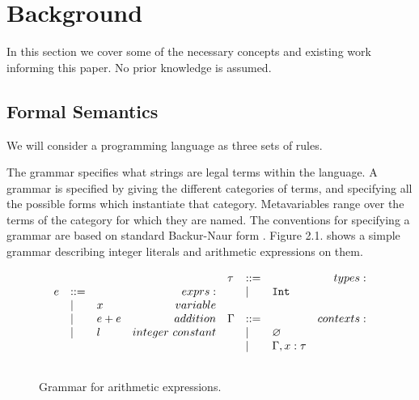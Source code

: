 \chapter{Background}\label{C:background}

In this section we cover some of the necessary concepts and existing work informing this paper. No prior knowledge is assumed.

\section{Formal Semantics}

\noindent
We will consider a programming language as three sets of rules.

The grammar specifies what strings are legal terms within the language. A grammar is specified by giving the different categories of terms, and specifying all the possible forms which instantiate that category. Metavariables range over the terms of the category for which they are named. The conventions for specifying a grammar are based on standard Backur-Naur form \cite{bnf}. Figure 2.1. shows a simple grammar describing integer literals and arithmetic expressions on them.

\begin{figure}[h]

\[
\begin{array}{c}

\begin{array}{lllr}

e & ::= & ~ & exprs: \\
	& | & x & variable \\
	& | & e + e & addition \\
	& | & l & integer~constant \\
	&&\\

\end{array}

\begin{array}{lllr}

\tau & ::= & ~ & types: \\
	& | & \mathtt{Int} \\
	&&\\
	
\Gamma & ::= & ~ & contexts: \\
	& | & \varnothing \\
	& | & \Gamma, x: \tau \\
	&&\\

\end{array}

\end{array}
\]

\vspace{-7pt}
\caption{Grammar for arithmetic expressions.}
\label{A sample. }
\end{figure}

